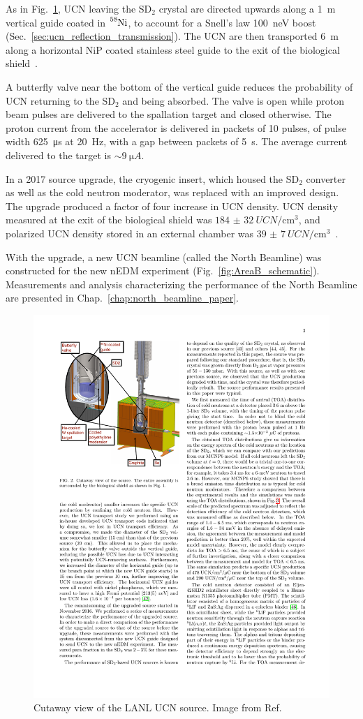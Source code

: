 As in Fig.~\ref{fig:lanl_ucn_source}, UCN leaving the SD$_2$ crystal are directed upwards along a \qty{1}{\meter} vertical guide coated in $\ce{^{58}Ni}$, to account for a Snell's law \qty{100}{\nano\eV} boost (Sec.~\ref{sec:ucn_reflection_transmission}). The UCN are then transported \qty{6}{\meter} along a horizontal NiP coated stainless steel guide to the exit of the biological shield~\cite{ito_performance_2018}.

A butterfly valve near the bottom of the vertical guide reduces the probability of UCN returning to the SD$_2$ and being absorbed. The valve is open while proton beam pulses are delivered to the spallation target and closed otherwise. The proton current from the accelerator is delivered in packets of 10 pulses, of pulse width \qty{625}{\micro\s} at \qty{20}{\hertz}, with a gap between packets of \qty{5}{\s}. The average current delivered to the target is $\sim\qty{9}{\micro A}$.

In a 2017 source upgrade, the cryogenic insert, which housed the SD$_2$ converter as well as the cold neutron moderator, was replaced with an improved design. The upgrade produced a factor of four increase in UCN density. UCN density measured at the exit of the biological shield was $\qty{184(32)}{UCN\per \cm^3}$, and polarized UCN density stored in an external chamber was $\qty{39(7)}{UCN\per \cm^3}$~\cite{ito_performance_2018}.

With the upgrade, a new UCN beamline (called the North Beamline) was constructed for the new nEDM experiment (Fig.~\ref{fig:AreaB_schematic}). Measurements and analysis characterizing the performance of the North Beamline are presented in Chap.~\ref{chap:north_beamline_paper}.

\begin{figure}[htp]
    \centering
    \includegraphics[width=0.45 \textwidth]{figures/lanl_ucn_source.pdf}
    \caption[Cutaway view of the LANL UCN source]
    {Cutaway view of the LANL UCN source. Image from Ref.~\cite{ito_performance_2018}}
    \label{fig:lanl_ucn_source}
\end{figure}


